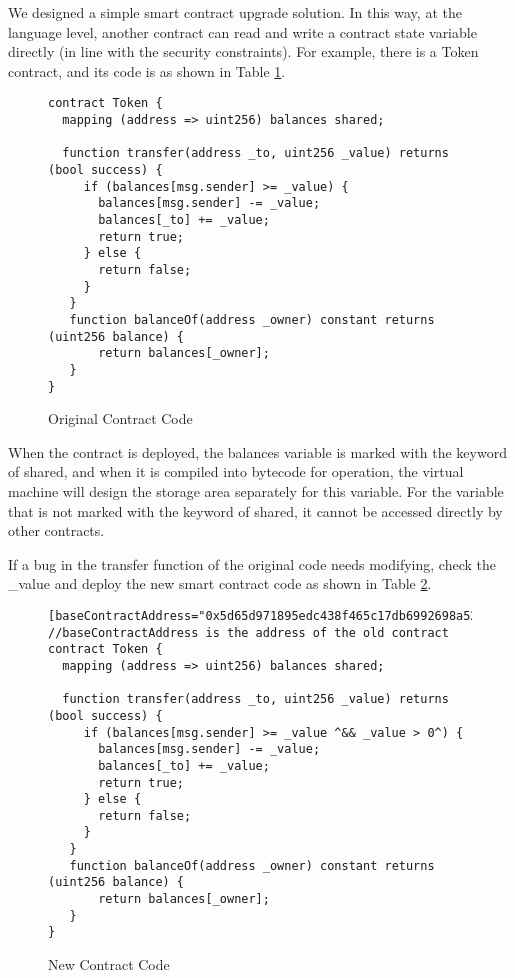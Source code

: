 We designed a simple smart contract upgrade solution. In this way, at the language level, another contract can read and write a contract state variable directly (in line with the security constraints). For example, there is a Token contract, and its code is as shown in Table \ref{figure:nf:oldsc}. \\

	\begin{figure}[!h]
  	\centering
  	\begin{minipage}{0.95\linewidth}
	\begin{lstlisting}[frame=single]
contract Token {
  mapping (address => uint256) balances shared;

  function transfer(address _to, uint256 _value) returns (bool success) {
     if (balances[msg.sender] >= _value) {
       balances[msg.sender] -= _value;
       balances[_to] += _value;
       return true;
     } else {
       return false;
     }
   }
   function balanceOf(address _owner) constant returns (uint256 balance) {
       return balances[_owner];
   }
}
	\end{lstlisting}
  	\end{minipage}
  	\caption{Original Contract Code}
  	\label{figure:nf:oldsc}
	\end{figure}

When the contract is deployed, the balances variable is marked with the keyword of shared, and when it is compiled into bytecode for operation, the virtual machine will design the storage area separately for this variable. For the variable that is not marked with the keyword of shared, it cannot be accessed directly by other contracts.

If a bug in the transfer function of the original code needs modifying, check the \_value and deploy the new smart contract code as shown in Table \ref{figure:nf:newsc}.

	\begin{figure}[!h]
  	\centering
  	\begin{minipage}{0.95\linewidth}
	\begin{lstlisting}[frame=single]
[baseContractAddress="0x5d65d971895edc438f465c17db6992698a52318d"]
//baseContractAddress is the address of the old contract
contract Token {
  mapping (address => uint256) balances shared;

  function transfer(address _to, uint256 _value) returns (bool success) {
     if (balances[msg.sender] >= _value ^&& _value > 0^) {
       balances[msg.sender] -= _value;
       balances[_to] += _value;
       return true;
     } else {
       return false;
     }
   }
   function balanceOf(address _owner) constant returns (uint256 balance) {
       return balances[_owner];
   }
}
	\end{lstlisting}
  	\end{minipage}
  	\caption{New Contract Code}
  	\label{figure:nf:newsc}
	\end{figure}


